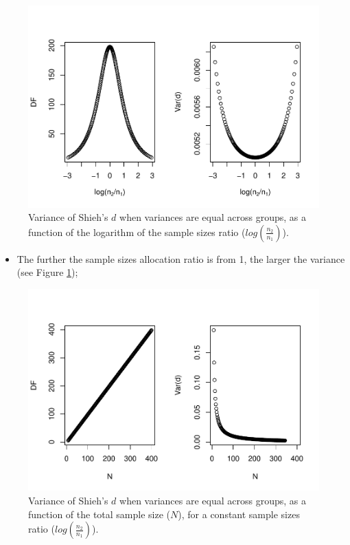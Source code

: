 \documentclass[
  english,
  man,mask]{apa6}
\providecommand{\tightlist}{%
  \setlength{\itemsep}{0pt}\setlength{\parskip}{0pt}}
\begin{document}
\begin{figure}
\centering
\includegraphics{Theoretical-Bias-of-all-estimators-as-a-function-of-population-parameters_files/figure-latex/varshiehHomNratio2-1.pdf}
\caption{\label{fig:varshiehHomNratio2}Variance of Shieh's \(d\) when variances are equal across groups, as a function of the logarithm of the sample sizes ratio (\(log\left(\frac{n_2}{n_1} \right)\)).}
\end{figure}

\begin{itemize}
\tightlist
\item
  The further the sample sizes allocation ratio is from 1, the larger the variance (see Figure \ref{fig:varshiehHomNratio2});
\end{itemize}

\begin{figure}
\centering
\includegraphics{Theoretical-Bias-of-all-estimators-as-a-function-of-population-parameters_files/figure-latex/varshiehhomNsize2-1.pdf}
\caption{\label{fig:varshiehhomNsize2}Variance of Shieh's \(d\) when variances are equal across groups, as a function of the total sample size (\(N\)), for a constant sample sizes ratio (\(log\left(\frac{n_2}{n_1} \right)\)).}
\end{figure}
\end{document}
